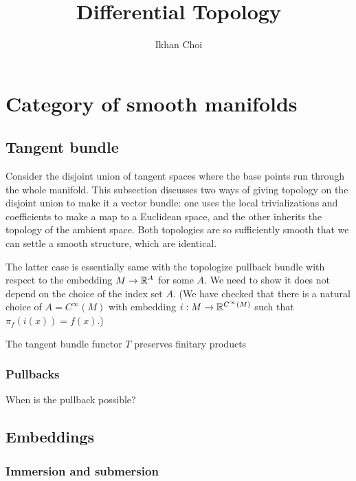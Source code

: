\documentclass{../note}
\begin{document}
\title{Differential Topology}
\author{Ikhan Choi}
\maketitle
\tableofcontents



\part{Category of smooth manifolds}


\chapter{Tangent bundle}
Consider the disjoint union of tangent spaces where the base points run through the whole manifold.
This subsection discusses two ways of giving topology on the disjoint union to make it a vector bundle: one uses the local trivializations and coefficients to make a map to a Euclidean space, and the other inherits the topology of the ambient space.
Both topologies are so sufficiently smooth that we can settle a smooth structure, which are identical.

The latter case is essentially same with the topologize pullback bundle with respect to the embedding $M\to\mathbb{R}^A$ for some $A$.
We need to show it does not depend on the choice of the index set $A$.
(We have checked that there is a natural choice of $A=C^\infty(M)$ with embedding $i:M\to\mathbb{R}^{C^\infty(M)}$ such that $\pi_f(i(x))=f(x)$.)


\begin{thm}
The tangent bundle functor $T$ preserves finitary products
\end{thm}


\section{Pullbacks}
When is the pullback possible?






\chapter{Embeddings}

\section{Immersion and submersion}
\end{document}
